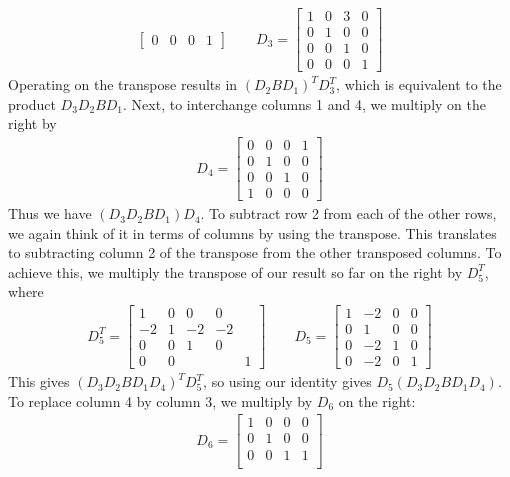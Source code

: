 \documentclass[12pt]{article}
\newenvironment{sol}[1][Solution]{\begin{trivlist}
		\item[\hskip \labelsep {\bfseries #1:}]}{\end{trivlist}}
\begin{document}
\begin{sol}
\begin{enumerate}[label=(\alph*)]
\begin{align*}
\begin{bmatrix}
				0 & 0 & 0 & 1
			\end{bmatrix}
			\quad \quad
			D_3 = \begin{bmatrix}
				1 & 0 & 3 & 0\\
				0 & 1 & 0 & 0\\
				0 & 0 & 1 & 0\\
				0 & 0 & 0 & 1
			\end{bmatrix}
		\end{align*}
		Operating on the transpose results in $(D_2BD_1)^TD_3^T$, which is equivalent to the
		product $D_3D_2BD_1$. Next, to interchange columns 1 and 4, we multiply on the right by
		\begin{align*}
			D_4 = \begin{bmatrix}
				0 & 0 & 0 & 1\\
				0 & 1 & 0 & 0\\
				0 & 0 & 1 & 0\\
				1 & 0 & 0 & 0
			\end{bmatrix}
		\end{align*}
		Thus we have $(D_3D_2BD_1)D_4$. To subtract row 2 from each of the other rows,
		we again think of it in terms of columns by using the transpose. This translates to
		subtracting column 2 of the transpose from the other transposed columns. To achieve
		this, we multiply the transpose of our result so far on the right by $D_5^T$, where
		\begin{align*}
			D_5^T=\begin{bmatrix}
				 1 & 0 &  0 &  0\\
				-2 & 1 & -2 & -2\\
				 0 & 0 &  1 &  0\\
				 0 & 0 &  & &  1
			\end{bmatrix}
			\quad \quad
				D_5=\begin{bmatrix}
				1 & -2 & 0 & 0\\
				0 &  1 & 0 & 0\\
				0 & -2 & 1 & 0\\
				0 & -2 & 0 & 1
			\end{bmatrix}
		\end{align*}
		This gives $(D_3D_2BD_1D_4)^TD_5^T$, so using our identity gives $D_5(D_3D_2BD_1D_4)$.
		To replace column 4 by column 3, we multiply by $D_6$ on the right:
		\begin{align*}
			D_6=\begin{bmatrix}
				1 & 0 & 0 & 0\\
				0 & 1 & 0 & 0\\
				0 & 0 & 1 & 1\\

\end{bmatrix}
\end{align*}
\end{enumerate}
\end{sol}
\end{document}
